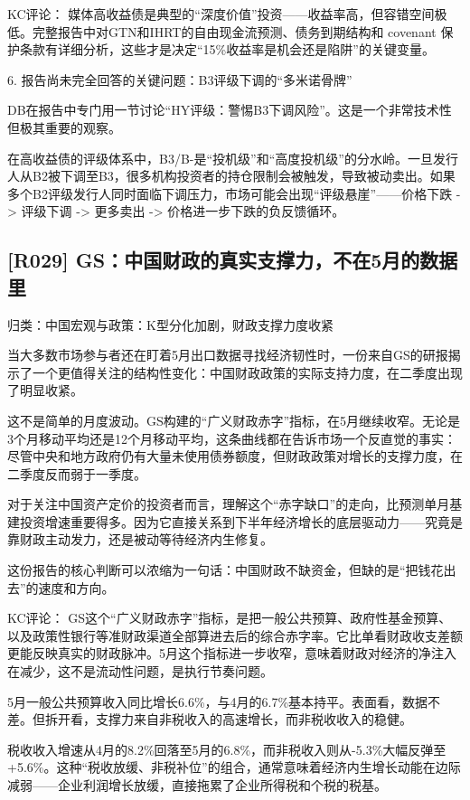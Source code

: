 \documentclass[11pt]{ctexart}
\begin{document}
KC评论： 媒体高收益债是典型的“深度价值”投资——收益率高，但容错空间极低。完整报告中对GTN和IHRT的自由现金流预测、债务到期结构和 covenant 保护条款有详细分析，这些才是决定“15\%收益率是机会还是陷阱”的关键变量。

6. 报告尚未完全回答的关键问题：B3评级下调的“多米诺骨牌”

DB在报告中专门用一节讨论“HY评级：警惕B3下调风险”。这是一个非常技术性但极其重要的观察。

在高收益债的评级体系中，B3/B-是“投机级”和“高度投机级”的分水岭。一旦发行人从B2被下调至B3，很多机构投资者的持仓限制会被触发，导致被动卖出。如果多个B2评级发行人同时面临下调压力，市场可能会出现“评级悬崖”——价格下跌 -> 评级下调 -> 更多卖出 -> 价格进一步下跌的负反馈循环。

\subsection{[R029] GS：中国财政的真实支撑力，不在5月的数据里}
{\small\color{refgray}归类：中国宏观与政策：K型分化加剧，财政支撑力度收紧}

当大多数市场参与者还在盯着5月出口数据寻找经济韧性时，一份来自GS的研报揭示了一个更值得关注的结构性变化：中国财政政策的实际支持力度，在二季度出现了明显收紧。

这不是简单的月度波动。GS构建的“广义财政赤字”指标，在5月继续收窄。无论是3个月移动平均还是12个月移动平均，这条曲线都在告诉市场一个反直觉的事实：尽管中央和地方政府仍有大量未使用债券额度，但财政政策对增长的支撑力度，在二季度反而弱于一季度。

对于关注中国资产定价的投资者而言，理解这个“赤字缺口”的走向，比预测单月基建投资增速重要得多。因为它直接关系到下半年经济增长的底层驱动力——究竟是靠财政主动发力，还是被动等待经济内生修复。

这份报告的核心判断可以浓缩为一句话：中国财政不缺资金，但缺的是“把钱花出去”的速度和方向。

KC评论： GS这个“广义财政赤字”指标，是把一般公共预算、政府性基金预算、以及政策性银行等准财政渠道全部算进去后的综合赤字率。它比单看财政收支差额更能反映真实的财政脉冲。5月这个指标进一步收窄，意味着财政对经济的净注入在减少，这不是流动性问题，是执行节奏问题。

5月一般公共预算收入同比增长6.6\%，与4月的6.7\%基本持平。表面看，数据不差。但拆开看，支撑力来自非税收入的高速增长，而非税收收入的稳健。

税收收入增速从4月的8.2\%回落至5月的6.8\%，而非税收入则从-5.3\%大幅反弹至+5.6\%。这种“税收放缓、非税补位”的组合，通常意味着经济内生增长动能在边际减弱——企业利润增长放缓，直接拖累了企业所得税和个税的税基。
\end{document}

